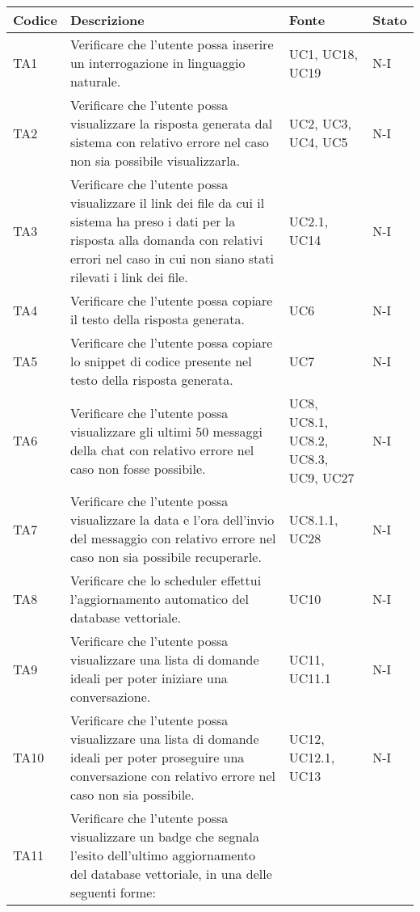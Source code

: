 \begin{table}[h!]
    \centering
    \renewcommand{\arraystretch}{1.5} %
    \begin{tabularx}{\textwidth}{|p{}|X|p{}|p{}|}\hline
    \rowcolor[HTML]{FFD700}
    \textbf{Codice} & \textbf{Descrizione} & \textbf{Fonte} & \textbf{Stato} \\ \hline
    TA1 & Verificare che l'utente possa inserire un interrogazione in linguaggio naturale. & UC1, UC18, UC19 & N-I \\ \hline
    TA2 & Verificare che l'utente possa visualizzare la risposta generata dal sistema con relativo errore nel caso non sia possibile visualizzarla. & UC2, UC3, UC4, UC5 & N-I \\ \hline
    TA3 & Verificare che l'utente possa visualizzare il link dei file da cui il sistema ha preso i dati per la risposta alla domanda con relativi errori nel caso in cui non siano stati rilevati i link dei file.  & UC2.1, UC14 & N-I \\ \hline
    TA4 & Verificare che l'utente possa copiare il testo della risposta generata. & UC6 & N-I \\ \hline
    TA5 & Verificare che l'utente possa copiare lo snippet di codice presente nel testo della risposta generata. & UC7 & N-I \\ \hline
    TA6 & Verificare che l'utente possa visualizzare gli ultimi 50 messaggi della chat con relativo errore nel caso non fosse possibile.  & UC8, UC8.1, UC8.2, UC8.3, UC9, UC27 & N-I \\ \hline
    TA7 & Verificare che l'utente possa visualizzare la data e l'ora dell'invio del messaggio con relativo errore nel caso non sia possibile recuperarle. & UC8.1.1, UC28 & N-I \\ \hline
    TA8 & Verificare che lo scheduler effettui l'aggiornamento automatico del database vettoriale. & UC10 & N-I \\ \hline
    TA9 & Verificare che l'utente possa visualizzare una lista di domande ideali per poter iniziare una conversazione. & UC11, UC11.1 & N-I \\ \hline
    TA10 & Verificare che l'utente possa visualizzare una lista di domande ideali per poter proseguire una conversazione con relativo errore nel caso non sia possibile. & UC12, UC12.1, UC13 & N-I \\ \hline
    TA11 & Verificare che l'utente possa visualizzare un badge che segnala l'esito dell'ultimo aggiornamento del database vettoriale, in una delle seguenti forme:

\end{tabularx}
\end{table}

